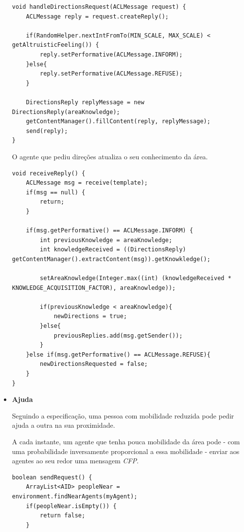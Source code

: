 \documentclass[12pt]{article}
\begin{document}
\begin{titlepage}
\begin{itemize}
\begin{lstlisting}[caption= Código \textit{Java}\ da função responsável pela receção de pedidos de direções.]
void handleDirectionsRequest(ACLMessage request) {
	ACLMessage reply = request.createReply();
	
	if(RandomHelper.nextIntFromTo(MIN_SCALE, MAX_SCALE) < getAltruisticFeeling()) {
		reply.setPerformative(ACLMessage.INFORM);
	}else{
		reply.setPerformative(ACLMessage.REFUSE);
	}
	
	DirectionsReply replyMessage = new DirectionsReply(areaKnowledge);
	getContentManager().fillContent(reply, replyMessage);
	send(reply);
}
\end{lstlisting}

O agente que pediu direções atualiza o seu conhecimento da área.

\begin{lstlisting}[caption= Código \textit{Java}\ da função responsável pela receção de respostas a um pedido de direções.]
void receiveReply() {
	ACLMessage msg = receive(template);
	if(msg == null) {
		return;
	}
	
	if(msg.getPerformative() == ACLMessage.INFORM) {				
		int previousKnowledge = areaKnowledge;
		int knowledgeReceived = ((DirectionsReply) getContentManager().extractContent(msg)).getKnowkledge();
		
		setAreaKnowledge(Integer.max((int) (knowledgeReceived * KNOWLEDGE_ACQUISITION_FACTOR), areaKnowledge));
		
		if(previousKnowledge < areaKnowledge){
			newDirections = true;
		}else{
			previousReplies.add(msg.getSender());
		}
	}else if(msg.getPerformative() == ACLMessage.REFUSE){			
		newDirectionsRequested = false;
	}
}
\end{lstlisting}
\item \textbf{Ajuda}

Seguindo a especificação, uma pessoa com mobilidade reduzida pode pedir ajuda a outra na sua proximidade. 

A cada instante, um agente que tenha pouca mobilidade da área pode - com uma probabilidade inversamente proporcional a essa mobilidade - enviar aos agentes ao seu redor uma mensagem \textit{CFP}.

\begin{lstlisting}[caption= Código \textit{Java}\ de envio de um pedido de ajuda.]
boolean sendRequest() {
	ArrayList<AID> peopleNear = environment.findNearAgents(myAgent);
	if(peopleNear.isEmpty()) {
		return false;
	}


\end{lstlisting}
\end{itemize}
\end{titlepage}
\end{document}
